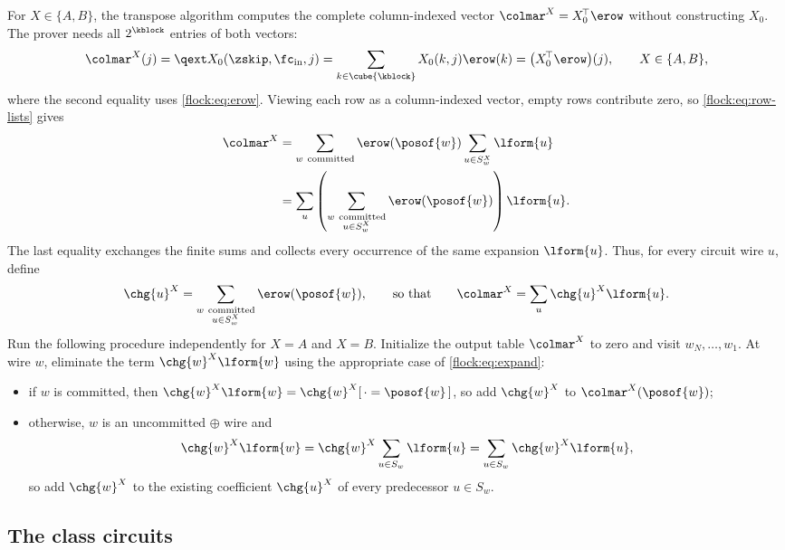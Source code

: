 For $X\in\{A,B\}$, the transpose algorithm computes the complete column-indexed vector $\colmar^{X}=X_0^{\!\top}\erow$ without constructing $X_0$. The prover needs all $2^{\kblock}$ entries of both vectors:
\begin{equation}\label{flock:eq:marginal}
\colmar^{X}(j)=\qext X_0(\zskip,\fc_{\mathrm{in}},j)=\sum_{k\in\cube{\kblock}}X_0(k,j)\erow(k)=\bigl(X_0^{\!\top}\erow\bigr)(j),\qquad X\in\{A,B\},
\end{equation}
where the second equality uses \eqref{flock:eq:erow}. Viewing each row as a column-indexed vector, empty rows contribute zero, so \eqref{flock:eq:row-lists} gives
\begin{align*}
\colmar^{X}
&=\sum_{w\ \mathrm{committed}}\erow(\posof{w})\sum_{u\in S^X_w}\lform{u}\\
&=\sum_u\left(\sum_{\substack{w\ \mathrm{committed}\\u\in S^X_w}}\erow(\posof{w})\right)\lform{u}.
\end{align*}
The last equality exchanges the finite sums and collects every occurrence of the same expansion $\lform{u}$. Thus, for every circuit wire $u$, define
\begin{equation*}
\chg{u}^{X}=\sum_{\substack{w\ \mathrm{committed}\\u\in S^X_w}}\erow(\posof{w}),
\qquad \text{so that}\qquad
\colmar^{X}=\sum_u\chg{u}^{X}\lform{u}.
\end{equation*}
Run the following procedure independently for $X=A$ and $X=B$. Initialize the output table $\colmar^{X}$ to zero and visit $w_N,\ldots,w_1$. At wire $w$, eliminate the term $\chg{w}^{X}\lform{w}$ using the appropriate case of \eqref{flock:eq:expand}:
\begin{itemize}
\item if $w$ is committed, then $\chg{w}^{X}\lform{w}=\chg{w}^{X}[\,\cdot=\posof{w}\,]$, so add $\chg{w}^{X}$ to $\colmar^{X}(\posof{w})$;
\item otherwise, $w$ is an uncommitted $\oplus$ wire and
\[
\chg{w}^{X}\lform{w}=\chg{w}^{X}\sum_{u\in S_w}\lform{u}=\sum_{u\in S_w}\chg{w}^{X}\lform{u},
\]
so add $\chg{w}^{X}$ to the existing coefficient $\chg{u}^{X}$ of every predecessor $u\in S_w$.
\end{itemize}

\subsection{The class circuits}\label{flock:classes}

